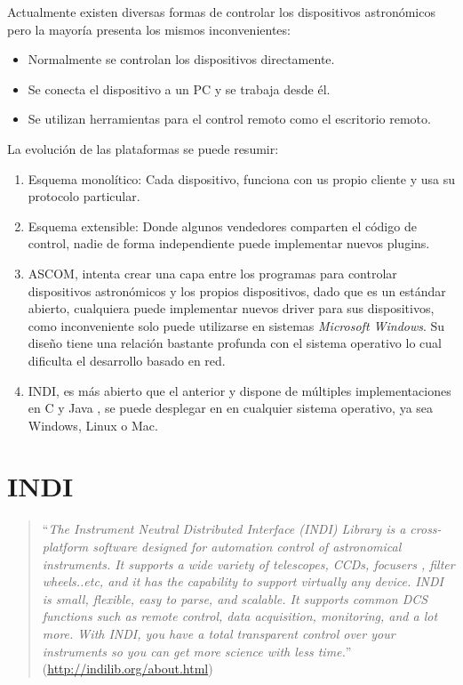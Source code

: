 Actualmente existen diversas formas de controlar los dispositivos astronómicos pero la mayoría presenta los mismos inconvenientes:

\begin{itemize}
	\item Normalmente se controlan los dispositivos directamente.
	\item Se conecta el dispositivo a un PC y se trabaja desde él.
	\item Se utilizan herramientas para el control remoto como el escritorio remoto.
\end{itemize}

\newpage

La evolución de las plataformas se puede resumir:

\begin{enumerate}
\item Esquema monolítico:  Cada dispositivo, funciona con us propio cliente y usa su protocolo particular.

\item Esquema extensible: Donde algunos vendedores comparten el código de control, nadie de forma independiente puede implementar nuevos plugins.

\item ASCOM, intenta crear una capa entre los programas para controlar dispositivos astronómicos y los propios dispositivos, dado que es un estándar abierto, cualquiera puede implementar nuevos driver para sus dispositivos, como inconveniente solo puede utilizarse en sistemas \textit{Microsoft Windows}. Su diseño tiene una relación bastante profunda con el sistema operativo lo cual dificulta el desarrollo basado en red.

\item INDI, es más abierto que el anterior y dispone de múltiples implementaciones en C y  Java \cite{indiforjava}, se puede desplegar en en cualquier sistema operativo, ya sea Windows, Linux o Mac. 

\end{enumerate}

\section{INDI}

\begin{quote}``\textit{The Instrument Neutral Distributed Interface (INDI) Library is a cross-platform software designed for automation  control of astronomical instruments. It supports a wide variety of telescopes, CCDs, focusers , filter wheels..etc, and it has the capability to support virtually any device. INDI is small, flexible, easy to parse, and scalable. It supports common DCS functions such as remote control, data acquisition, monitoring, and a lot more. With INDI, you have a total transparent control over your instruments so you can get more science with less time.}''
	\newline(\href{http://indilib.org/about.html}{http://indilib.org/about.html})
\end{quote}


